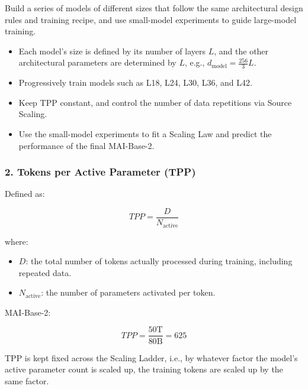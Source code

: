 \documentclass[
  english,
  11pt,
  a4paper,
]{article}
\providecommand{\tightlist}{%
  \setlength{\itemsep}{0pt}\setlength{\parskip}{0pt}}
\newenvironment{NotesFormula}{%
  \par\noindent\begin{minipage}{\linewidth}%
  \setlength{\parindent}{2em}%
  \setlength{\parskip}{0.35em}%
}{\end{minipage}\par}
\begin{document}
Build a series of models of different sizes that follow the same
architectural design rules and training recipe, and use small-model
experiments to guide large-model training.

\begin{itemize}
\tightlist
\item
  Each model's size is defined by its number of layers \(L\), and the
  other architectural parameters are determined by \(L\), e.g.,
  \(d_{\mathrm{model}}=\frac{256}{3}L\).
\item
  Progressively train models such as L18, L24, L30, L36, and L42.
\item
  Keep TPP constant, and control the number of data repetitions via
  Source Scaling.
\item
  Use the small-model experiments to fit a Scaling Law and predict the
  performance of the final MAI-Base-2.
\end{itemize}

\subsubsection{2. Tokens per Active Parameter
(TPP)}\label{tokens-per-active-parameter-tpp}

\begin{NotesFormula}

Defined as:

\[\boxed{TPP=\frac{D}{N_{\mathrm{active}}}}\]

\end{NotesFormula}

where:

\begin{itemize}
\tightlist
\item
  \(D\): the total number of tokens actually processed during training,
  including repeated data.
\item
  \(N_{\mathrm{active}}\): the number of parameters activated per token.
\end{itemize}

\begin{NotesFormula}

MAI-Base-2:

\[TPP=\frac{50\mathrm{T}}{80\mathrm{B}}=625\]

\end{NotesFormula}

TPP is kept fixed across the Scaling Ladder, i.e., by whatever factor
the model's active parameter count is scaled up, the training tokens are
scaled up by the same factor.
\end{document}
